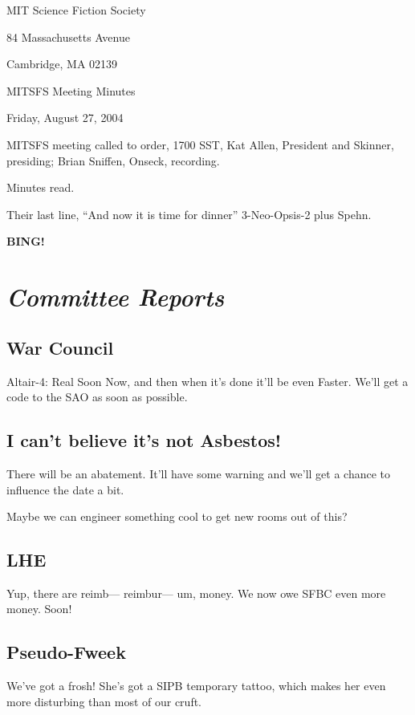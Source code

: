 \documentclass[10pt]{article}
\newcommand{\bing}{{\bf BING!} }
\newcommand{\goto}[1]{\bing \vskip 12pt \section*{{\em{#1}}}}
\newcommand{\ps}{ plus Spehn\xspace}
\begin{document}
\begin{center}

MIT Science Fiction Society 

84 Massachusetts Avenue

Cambridge, MA 02139

\vspace{12pt}

MITSFS Meeting Minutes 

Friday, August 27, 2004

\end{center}
 
\vspace{18pt}

\setlength{\parskip}{6pt}

\noindent
MITSFS meeting called to order, 1700 SST, Kat Allen, President and
Skinner, presiding; Brian Sniffen,  Onseck, recording.

Minutes read.

Their last line, ``And now it is time for dinner'' 3-Neo-Opsis-2\ps.


\goto{Committee Reports}
\subsection*{War Council}

Altair-4: Real Soon Now, and then when it's done it'll be even Faster.
We'll get a code to the SAO as soon as possible.

\subsection*{I can't believe it's not Asbestos!}
There will be an abatement.  It'll have some warning and we'll get a
chance to influence the date a bit.

Maybe we can engineer something cool to get new rooms out of this?

\subsection*{LHE}

Yup, there are reimb--- reimbur--- um, money.  We now owe SFBC even
more money.  Soon!

\subsection*{Pseudo-Fweek}
We've got a frosh!  She's got a SIPB temporary tattoo, which makes her
even more disturbing than most of our cruft.
\end{document}
